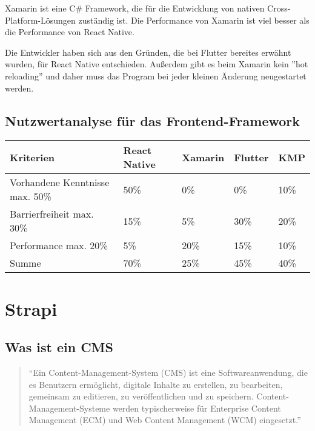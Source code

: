 \begin{spacing}{1}
    Xamarin ist eine C\# Framework, die für die Entwicklung von nativen Cross-Platform-Lösungen zuständig ist.
    Die Performance von Xamarin ist viel besser als die Performance von React Native. \cite{xamarin-vs-react-native}

    Die Entwickler haben sich aus den Gründen, die bei Flutter bereites erwähnt wurden, für React Native entschieden.
    Außerdem gibt es beim Xamarin kein ''hot reloading'' und daher muss das
    Program bei jeder kleinen Änderung neugestartet werden.\cite{xamarin-vs-react-native}



    \subsection{Nutzwertanalyse für das Frontend-Framework}
    \begin{tabular}{|p{5cm} | p{2cm} | p{2cm} | p{2cm} | p{2cm} | }
        \hline
        Kriterien                      & React Native & Xamarin & Flutter & KMP  \\
        \hline
        Vorhandene Kenntnisse max. 50\% & 50\%         & 0\%     & 0\%     & 10\% \\
        \hline
        Barrierfreiheit max. 30\%      & 15\%         & 5\%     & 30\%    & 20\% \\
        \hline
        Performance max. 20\%          & 5\%          & 20\%    & 15\%    & 10\% \\
        \hline
        Summe                          & 70\%         & 25\%    & 45\%    & 40\% \\
        \hline
    \end{tabular}





    \section{Strapi}

    \subsection{Was ist ein CMS}

    \begin{quotation}
        ``Ein Content-Management-System (CMS) ist eine Softwareanwendung,
        die es Benutzern ermöglicht, digitale Inhalte zu erstellen, zu bearbeiten, gemeinsam zu editieren,
        zu veröffentlichen und zu speichern. Content-Management-Systeme werden typischerweise für Enterprise
        Content Management (ECM) und Web Content Management (WCM) eingesetzt.''
        \cite{cms}
    \end{quotation}




\end{spacing}
